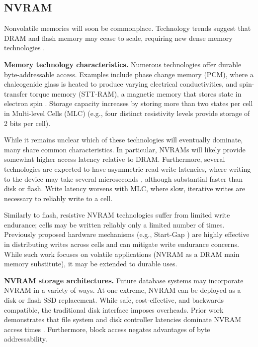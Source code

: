 \subsection{NVRAM}
\label{sec:Background:Storage:NVRAM}

Nonvolatile memories will soon be commonplace.
Technology trends suggest that DRAM and flash memory may cease to scale, requiring new dense memory technologies \cite{LeeIpek09}.

\textbf{Memory technology characteristics.}
Numerous technologies offer durable byte-addressable access.
Examples include phase change memory (PCM), where a chalcogenide glass is heated to produce varying electrical conductivities, and spin-transfer torque memory (STT-RAM), a magnetic memory that stores state in electron spin \cite{BurrKurdi08}.
Storage capacity increases by storing more than two states per cell in Multi-level Cells (MLC) (e.g., four distinct resistivity levels provide storage of 2 bits per cell).

While it remains unclear which of these technologies will eventually dominate, many share common characteristics.
In particular, NVRAMs will likely provide somewhat higher access latency relative to DRAM.
Furthermore, several technologies are expected to have asymmetric read-write latencies, where writing to the device may take several microseconds \cite{QureshiSrinivasan09}, although substantial faster than disk or flash.
Write latency worsens with MLC, where slow, iterative writes are necessary to reliably write to a cell.

Similarly to flash, resistive NVRAM technologies suffer from limited write endurance; cells may be written reliably only a limited number of times.
Previously proposed hardware mechanisms (e.g., Start-Gap \cite{QureshiKaridis09}) are highly effective in distributing writes across cells and can mitigate write endurance concerns.
While such work focuses on volatile applications (NVRAM as a DRAM main memory substitute), it may be extended to durable uses.

\textbf{NVRAM storage architectures.}
Future database systems may incorporate NVRAM in a variety of ways.
At one extreme, NVRAM can be deployed as a disk or flash SSD replacement.
While safe, cost-effective, and backwards compatible, the traditional disk interface imposes overheads.
Prior work demonstrates that file system and disk controller latencies dominate NVRAM access times \cite{CaulfieldDe10}.
Furthermore, block access negates advantages of byte addressability.

